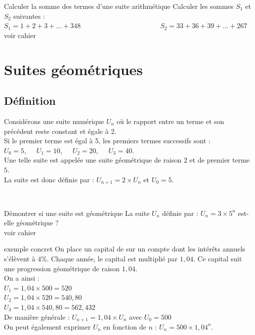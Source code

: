 \begin{bmethodet}{Calculer la somme des termes d'une suite arithmétique}
	Calculer les sommes $S_1$ et $S_2$ suivantes :\\ 
	$S_1=1+2+3+...+348$\ \ \ \ \ \ \ \ \ \ \ \ \ \ \ \ \ \ \ \ \ \ \ $S_2=33+36+39+...+267$
	\\
	voir cahier
\end{bmethodet}

\section{Suites géométriques}

\subsection{Définition}

\begin{bexemple}
	Considérons une suite numérique $U_n$ où le rapport entre un terme et son précédent reste constant et égale à 2.\\
	Si le premier terme est égal à 5, les premiers termes successifs sont :\\
	$U_0 = 5$,\ \ \ 
	$U_1 = 10$,\ \ \ 
	$U_2 = 20$,\ \ \ 
	$U_3 = 40$.\\
	Une telle suite est appelée une suite géométrique de raison $2$ et de premier terme $5$.\\
	La suite est donc définie par : $U_{n+1}=2\times U_n$ et $U_0=5$. 
\end{bexemple}

\begin{bdefi}
	\pointille[\textwidth-1cm]\\
	\pointille[\textwidth-1cm]
\end{bdefi}

\begin{bmethodet}{Démontrer si une suite est géométrique}
	La suite $U_n$ définie par : $U_n=3\times 5^n$  est-elle géométrique ?
	\ \\
	voir cahier
\end{bmethodet}

\begin{bexemplet}{exemple concret}
	On place un capital de  sur un compte dont les intérêts annuels s'élèvent à $4\%$.
	Chaque année, le capital est multiplié par $1,04$.
	Ce capital suit une progression géométrique de raison $1,04$.\\
	
	On a ainsi :\\ 
	$U_1=1,04\times 500=520$\\		
	$U_2=1,04\times 520=540,80$\\
	$U_3=1,04\times 540,80=562,432$\\	
	De manière générale : $U_{n+1}=1,04\times U_n$ avec $U_0=500$\\ 
	On peut également exprimer $U_n$ en fonction de $n$ : $U_n= 500\times1,04^n$. 
\end{bexemplet}

